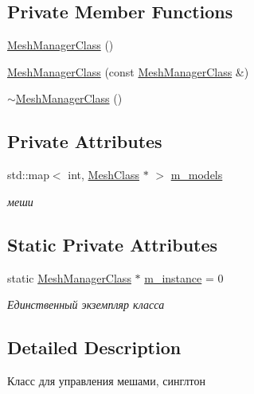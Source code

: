 \subsection*{Private Member Functions}
\begin{DoxyCompactItemize}
\item 
\hyperlink{class_mesh_manager_class_abd77802ae7d2280adb7c37827d21e30c}{Mesh\+Manager\+Class} ()
\item 
\hyperlink{class_mesh_manager_class_ada07120852998059dba9d8e94bfa155c}{Mesh\+Manager\+Class} (const \hyperlink{class_mesh_manager_class}{Mesh\+Manager\+Class} \&)
\item 
\hyperlink{class_mesh_manager_class_a4d3f166db635cd9db82f248320c197cd}{$\sim$\+Mesh\+Manager\+Class} ()
\end{DoxyCompactItemize}
\subsection*{Private Attributes}
\begin{DoxyCompactItemize}
\item 
std\+::map$<$ int, \hyperlink{class_mesh_class}{Mesh\+Class} $\ast$ $>$ \hyperlink{class_mesh_manager_class_a9b067aa5baf931abddbf9c47f5ab6b43}{m\+\_\+models}
\begin{DoxyCompactList}\small\item\em меши \end{DoxyCompactList}\end{DoxyCompactItemize}
\subsection*{Static Private Attributes}
\begin{DoxyCompactItemize}
\item 
static \hyperlink{class_mesh_manager_class}{Mesh\+Manager\+Class} $\ast$ \hyperlink{class_mesh_manager_class_a9d8f0b9a7d3613a52de123401863e0d0}{m\+\_\+instance} = 0
\begin{DoxyCompactList}\small\item\em Единственный экземпляр класса \end{DoxyCompactList}\end{DoxyCompactItemize}


\subsection{Detailed Description}
Класс для управления мешами, синглтон 

